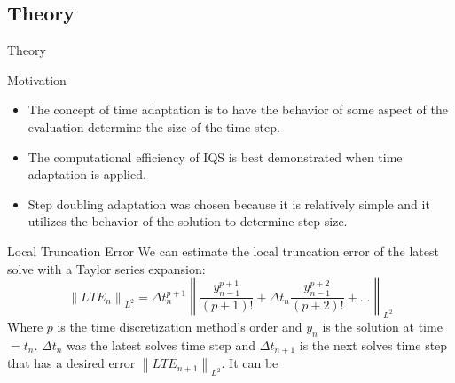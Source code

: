 \documentclass[8pt]{beamer}
\newcommand{\be}{\begin{equation*}}
\newcommand{\ee}{\end{equation*}}
\newcommand{\norm}[1]{\left\lVert#1\right\rVert_{L^2}}
\begin{document}
\subsection{Theory}

\begin{frame}{Theory}

\begin{block}{Motivation}
\begin{itemize}
\item The concept of time adaptation is to have the behavior of some aspect of the evaluation determine the size of the time step.
\item The computational efficiency of IQS is best demonstrated when time adaptation is applied.
\item Step doubling adaptation was chosen because it is relatively simple and it utilizes the behavior of the solution to determine step size.
\end{itemize}
\end{block}

\begin{block}{Local Truncation Error}
We can estimate the local truncation error of the latest solve with a Taylor series expansion:
\be
\norm{LTE_n} = \Delta t_n^{p+1} \norm{\frac{y^{p+1}_{n-1}}{(p+1)!} + \Delta t_n \frac{y^{p+2}_{n-1}}{(p+2)!} + ...}
\ee
Where $p$ is the time discretization method's order and $y_n$ is the solution at time $ = t_n$. $\Delta t_n$ was the latest solves time step and $\Delta t_{n+1}$ is the next solves time step that has a desired error $\norm{LTE_{n+1}}$.  It can be

\end{block}

\end{frame}
\end{document}

